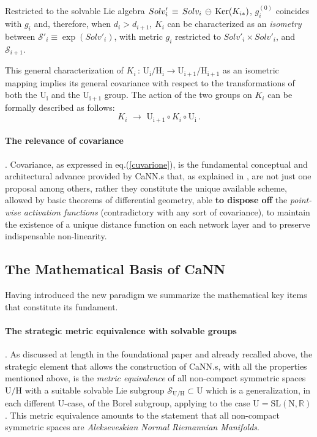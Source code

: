 \documentclass[10pt,a4paper]{article}
\begin{document}
 Restricted to the solvable Lie algebra $Solv'_i\,\equiv\, Solv_i\,\ominus\, {\rm Ker}(K_{i*})$, $g_i^{(0)}$ coincides with $g_i$ and, therefore, when $d_i>d_{i+1}$, $K_i$ can be characterized as an \emph{isometry} between $\mathcal{S}'_i\equiv \exp(Solv'_i)$, with metric $g_i$ restricted to $Solv'_i\times Solv'_i$, and $\mathcal{S}_{i+1}$.\par
This general characterization of $K_i \, : \, \mathrm{U_i/H_i} \to \mathrm{U_{i+1}/H_{i+1}}$ as an isometric mapping implies its general covariance with respect to the transformations of both the $\mathrm{U_{i}}$ and the $\mathrm{U_{i+1}}$ group.
The action of the two groups on $K_i$ can be formally described as follows:
\begin{equation}\label{cuvarione}
  K_i\,\,\rightarrow\,\,\mathrm{U_{i+1}}\circ K_i\circ \mathrm{U_{i}}\,.
\end{equation}

\paragraph{The relevance of covariance}.
Covariance, as expressed in eq.(\ref{cuvarione}), is the fundamental conceptual and architectural advance provided by CaNN.s that, as explained in \cite{TSnaviga}, are not just one proposal among others, rather they constitute the unique available scheme, allowed by basic theorems of differential geometry, able  \textbf{to dispose off} the \textit{point-wise activation functions} (contradictory with any sort of covariance), to maintain the existence of a unique distance function on each network layer and to preserve indispensable non-linearity.
\subsection{The  Mathematical Basis of CaNN}
Having introduced the new paradigm we summarize the mathematical
key items that constitute its fundament.
\paragraph{The strategic metric equivalence with solvable groups}. As discussed at length in the foundational paper \cite{pgtstheory} and already recalled above, the strategic element that allows the construction of CaNN.s, with all the properties mentioned above, is the \textit{metric equivalence} of all non-compact symmetric spaces
$\mathrm{U/H}$ with a suitable solvable Lie subgroup $\mathcal{S}_{\mathrm{U/H}} \subset \mathrm{U}$ which is a generalization, in each different $\mathrm{U}$-case, of the Borel subgroup, applying to the case $\mathrm{U}=\mathrm{SL(N,\mathbb{R})}$. This metric equivalence amounts to the statement that all
non-compact symmetric spaces are \textit{Alekseveskian Normal Riemannian Manifolds}.
\end{document}
